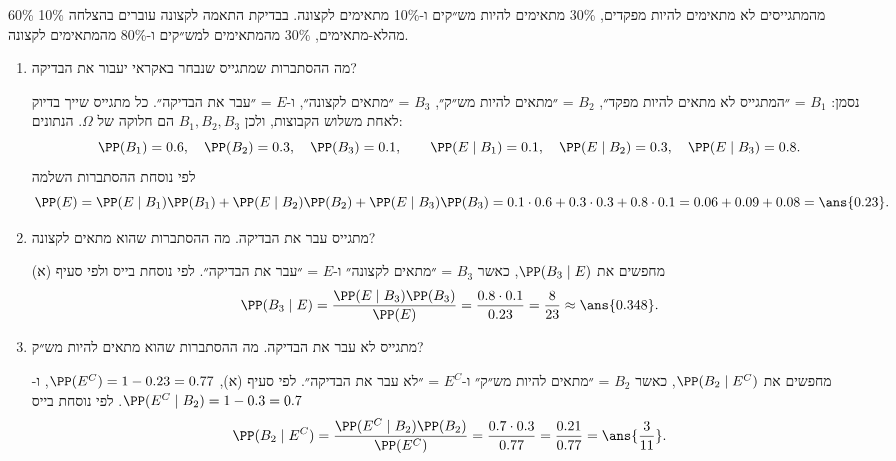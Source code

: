 60\% מהמתגייסים לא מתאימים להיות מפקדים, 30\% מתאימים להיות מש״קים ו-10\% מתאימים לקצונה. בבדיקת התאמה לקצונה עוברים בהצלחה 10\% מהלא-מתאימים, 30\% מהמתאימים למש״קים ו-80\% מהמתאימים לקצונה.
\begin{enumerate}
\item מה ההסתברות שמתגייס שנבחר באקראי יעבור את הבדיקה?
\begin{solbox}
נסמן:
$B_1$ = ״המתגייס לא מתאים להיות מפקד״, $B_2$ = ״מתאים להיות מש״ק״, $B_3$ = ״מתאים לקצונה״, ו-$E$ = ״עבר את הבדיקה״.
כל מתגייס שייך בדיוק לאחת משלוש הקבוצות, ולכן $B_1,B_2,B_3$ הם חלוקה של $\Omega$. הנתונים:
\[
\PP(B_1)=0.6,\quad \PP(B_2)=0.3,\quad \PP(B_3)=0.1,\qquad \PP(E\mid B_1)=0.1,\quad \PP(E\mid B_2)=0.3,\quad \PP(E\mid B_3)=0.8.
\]
לפי נוסחת ההסתברות השלמה
\[
\PP(E)=\PP(E\mid B_1)\PP(B_1)+\PP(E\mid B_2)\PP(B_2)+\PP(E\mid B_3)\PP(B_3)=0.1\cdot0.6+0.3\cdot0.3+0.8\cdot0.1=0.06+0.09+0.08=\ans{0.23}.
\]
\end{solbox}
\item מתגייס עבר את הבדיקה. מה ההסתברות שהוא מתאים לקצונה?
\begin{solbox}
מחפשים את $\PP(B_3\mid E)$, כאשר $B_3$ = ״מתאים לקצונה״ ו-$E$ = ״עבר את הבדיקה״. לפי נוסחת בייס ולפי סעיף (א)
\[
\PP(B_3\mid E)=\frac{\PP(E\mid B_3)\PP(B_3)}{\PP(E)}=\frac{0.8\cdot0.1}{0.23}=\frac8{23}\approx\ans{0.348}.
\]
\end{solbox}
\item מתגייס לא עבר את הבדיקה. מה ההסתברות שהוא מתאים להיות מש״ק?
\begin{solbox}
מחפשים את $\PP(B_2\mid E^C)$, כאשר $B_2$ = ״מתאים להיות מש״ק״ ו-$E^C$ = ״לא עבר את הבדיקה״. לפי סעיף (א), $\PP(E^C)=1-0.23=0.77$, ו-$\PP(E^C\mid B_2)=1-0.3=0.7$. לפי נוסחת בייס
\[
\PP(B_2\mid E^C)=\frac{\PP(E^C\mid B_2)\PP(B_2)}{\PP(E^C)}=\frac{0.7\cdot0.3}{0.77}=\frac{0.21}{0.77}=\ans{\frac3{11}}.
\]
\end{solbox}
\end{enumerate}
